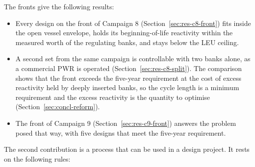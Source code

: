 The fronts give the following results:

\begin{itemize}
  \item Every design on the front of Campaign 8
        (Section~\ref{sec:res-c8-front}) fits inside the open vessel
        envelope, holds its beginning-of-life reactivity within the
        measured worth of the regulating banks, and stays below the LEU
        ceiling.

  \item A second set from the same campaign is controllable with two
        banks alone, as a commercial PWR is operated
        (Section~\ref{sec:res-c8-split}). The comparison shows that the
        front exceeds the five-year requirement at the cost of excess
        reactivity held by deeply inserted banks, so the cycle length is
        a minimum requirement and the excess reactivity is the quantity
        to optimise (Section~\ref{sec:concl-reform}).

  \item The front of Campaign 9 (Section~\ref{sec:res-c9-front})
        answers the problem posed that way, with five designs that meet
        the five-year requirement.
\end{itemize}

The second contribution is a process that can be used in a design
project. It rests on the following rules:

